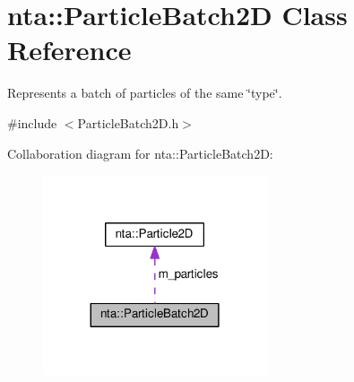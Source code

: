 \hypertarget{classnta_1_1ParticleBatch2D}{}\section{nta\+:\+:Particle\+Batch2D Class Reference}
\label{classnta_1_1ParticleBatch2D}


Represents a batch of particles of the same \char`\"{}type\char`\"{}.  




{\ttfamily \#include $<$Particle\+Batch2\+D.\+h$>$}



Collaboration diagram for nta\+:\+:Particle\+Batch2D\+:\nopagebreak
\begin{figure}[H]
\begin{center}
\leavevmode
\includegraphics[width=188pt]{d4/d22/classnta_1_1ParticleBatch2D__coll__graph}
\end{center}
\end{figure}
